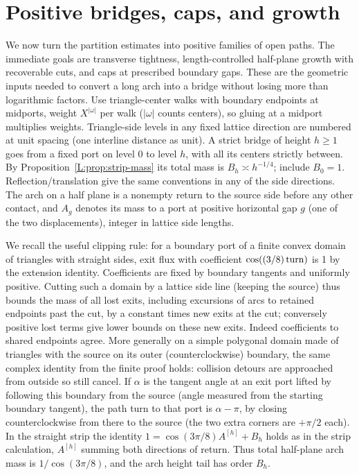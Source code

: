 \section{Positive bridges, caps, and growth}\label{L:part10}

We now turn the partition estimates into positive families of open paths. The immediate goals are transverse tightness, length-controlled half-plane growth with recoverable cuts, and caps at prescribed boundary gaps. These are the geometric inputs needed to convert a long arch into a bridge without losing more than logarithmic factors. Use triangle-center walks with boundary endpoints at midports, weight \(X^{|\omega|}\) per walk (\(|\omega|\) counts centers), so gluing at a midport multiplies weights. Triangle-side levels in any fixed lattice direction are numbered at unit spacing (one interline distance as unit). A strict bridge of height \(h\ge1\) goes from a fixed port on level 0 to level \(h\), with all its centers strictly between. By Proposition~\ref{L:prop:strip-mass} its total mass is \(B_h\asymp h^{-1/4}\); include \(B_0=1\). Reflection/translation give the same conventions in any of the side directions. The arch on a half plane is a nonempty return to the source side before any other contact, and \(A_g\) denotes its mass to a port at positive horizontal gap \(g\) (one of the two displacements), integer in lattice side lengths.

We recall the useful clipping rule: for a boundary port of a finite convex domain of triangles with straight sides, exit flux with coefficient \(\cos((3/8)\,{\rm turn})\) is 1 by the extension identity. Coefficients are fixed by boundary tangents and uniformly positive. Cutting such a domain by a lattice side line (keeping the source) thus bounds the mass of all lost exits, including excursions of arcs to retained endpoints past the cut, by a constant times new exits at the cut; conversely positive lost terms give lower bounds on these new exits. Indeed coefficients to shared endpoints agree. More generally on a simple polygonal domain made of triangles with the source on its outer (counterclockwise) boundary, the same complex identity from the finite proof holds: collision detours are approached from outside so still cancel. If \(\alpha\) is the tangent angle at an exit port lifted by following this boundary from the source (angle measured from the starting boundary tangent), the path turn to that port is \(\alpha-\pi\), by closing counterclockwise from there to the source (the two extra corners are \(+\pi/2\) each). In the straight strip the identity \(1=\cos(3\pi/8) A^{[h]}+B_h\) holds as in the strip calculation, \(A^{[h]}\) summing both directions of return. Thus total half-plane arch mass is \(1/\cos(3\pi/8)\), and the arch height tail has order \(B_h\).

